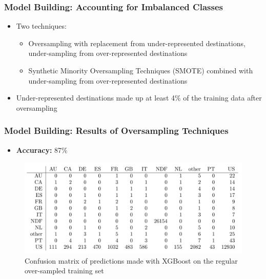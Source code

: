 \documentclass{beamer}
\begin{document}
\begin{frame}
\frametitle{Model Building: Accounting for Imbalanced Classes}
\begin{itemize}
  \item Two techniques:
  \begin{itemize}
    \item Oversampling with replacement from under-represented destinations, under-sampling from over-represented destinations
    \item Synthetic Minority Oversampling Techniques (SMOTE) combined with under-sampling from over-represented destinations 
  \end{itemize}
  \item Under-represented destinations made up at least 4\% of the training data after oversampling
\end{itemize}
\end{frame}


\begin{frame}
\frametitle{Model Building: Results of Oversampling Techniques}
\begin{itemize}
  \item \textbf{Accuracy:} 87\%
\end{itemize}
\begin{figure}
\includegraphics[width=1\linewidth]{confusion_matrix.png}
\caption{Confusion matrix of predictions made with XGBoost on the regular over-sampled training set}
\end{figure}
\end{frame}

\end{document}
